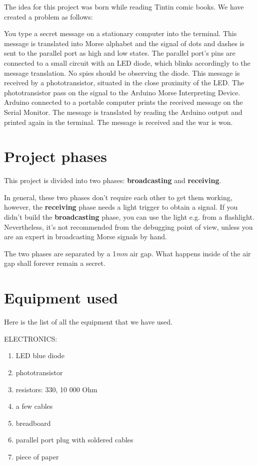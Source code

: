 \documentclass[12pt]{report}
\begin{document}
The idea for this project was born while reading Tintin comic books. We have created a problem as follows:

You type a secret message on a stationary computer into the terminal. This message is translated into Morse alphabet and the signal of dots and dashes is sent to the parallel port as high and low states. The parallel port's pins are connected to a small circuit with an LED diode, which blinks accordingly to the message translation. No spies should be observing the diode. This message is received by a phototransistor, situated in the close proximity of the LED. The phototransistor pass on the signal to the Arduino Morse Interpreting Device. Arduino connected to a portable computer prints the received message on the Serial Monitor. The message is translated by reading the Arduino output and printed again in the terminal. The message is received and the war is won.


\section{Project phases}

This project is divided into two phases: \textbf{broadcasting} and \textbf{receiving}. 

In general, these two phases don't require each other to get them working, however, the \textbf{receiving} phase needs a light trigger to obtain a signal. If you didn't build the  \textbf{broadcasting} phase, you can use the light e.g. from a flashlight. Nevertheless, it's not recommended from the debugging point of view, unless you are an expert in broadcasting Morse signals by hand.

The two phases are separated by a 1\textit{mm} air gap. What happens inside of the air gap shall forever remain a secret.


\section{Equipment used} \label{sec:equip}

Here is the list of all the equipment that we have used.

ELECTRONICS:

\begin{enumerate}

\item LED blue diode
\item phototransistor
\item resistors: 330, 10 000 Ohm
\item a few cables
\item breadboard
\item parallel port plug with soldered cables
\item piece of paper

\end{enumerate}
\end{document}
